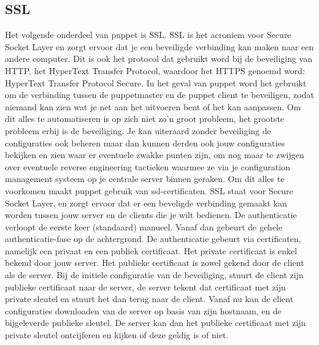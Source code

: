 \subsection{SSL}
Het volgende onderdeel van puppet is SSL. SSL is het acroniem voor Secure Socket Layer en zorgt ervoor dat je een beveiligde verbinding kan maken naar een andere computer. Dit is ook het protocol dat gebruikt word bij de beveiliging van HTTP, het HyperText Transfer Protocol, waardoor het HTTPS genoemd word: HyperText Transfer Protocol Secure. In het geval van puppet word het gebruikt om de verbinding tussen de puppetmaster en de puppet client te beveiligen, zodat niemand kan zien wat je net aan het uitvoeren bent of het kan aanpassen.
%
Om dit alles te automatiseren is op zich niet zo'n groot probleem, het grootste probleem erbij is de beveiliging. Je kan uiteraard zonder beveiliging de configuraties ook beheren maar dan kunnen derden ook jouw configuraties bekijken en zien waar er eventuele zwakke punten zijn, om nog maar te zwijgen over eventuele reverse engineering tactieken waarmee ze via je configuration management systeem op je centrale server binnen geraken. Om dit alles te voorkomen maakt puppet gebruik van ssl-certificaten. SSL staat voor Secure Socket Layer, en zorgt ervoor dat er een beveligde verbinding gemaakt kan worden tussen jouw server en de clients die je wilt bedienen. De authenticatie verloopt de eerste keer (standaard) manueel. Vanaf dan gebeurt de gehele authenticatie-fase op de achtergrond. De authenticatie gebeurt via certificaten, namelijk een privaat en een publiek certificaat. Het private certificaat is enkel bekend door jouw server. Het publieke certificaat is zowel gekend door de client als de server. Bij de initiele configuratie van de beveiliging, stuurt de client zijn publieke certificaat naar de server, de server tekent dat certificaat met zijn private sleutel en stuurt het dan terug naar de client. Vanaf nu kan de client configuraties downloaden van de server op basis van zijn hostnaam, en de bijgeleverde publieke sleutel. De server kan dan het publieke certificaat met zijn private sleutel ontcijferen en kijken of deze geldig is of niet.
